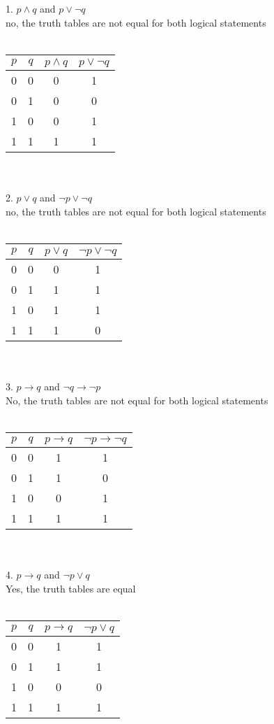 \documentclass[11pt]{article}
\begin{document}
1. $p \land q$ and $p \lor \neg q $ \\
no, the truth tables are not equal for both logical statements \\\\
\begin{tabular}{|c|c|c|c|}
\hline
$p$ & $q$ & $p \land q$ & $p \lor  \lnot q$ \\
\hline
0 & 0 & 0 & 1 \\
0 & 1 & 0 & 0 \\
1 & 0 & 0 & 1 \\
1 & 1 & 1 & 1 \\
\hline
\end{tabular} \\\\
2. $ p \lor q $ and $ \neg p \lor \neg q $ \\
no, the truth tables are not equal for both logical statements\\\\
\begin{tabular}{|c|c|c|c|}
\hline
$p$ & $q$ & $p \lor q$ & $ \lnot p \lor  \lnot q$ \\
\hline
0 & 0 & 0 & 1 \\
0 & 1 & 1 & 1 \\
1 & 0 & 1 & 1 \\
1 & 1 & 1 & 0 \\
\hline
\end{tabular} \\\\
3. $p \rightarrow q $ and $ \neg q \rightarrow \neg p $\\
No, the truth tables are not equal for both logical statements \\\\
\begin{tabular}{|c|c|c|c|}
\hline
$p$ & $q$ & $p \to q$ & $ \lnot p \to  \lnot q$ \\
\hline
0 & 0 & 1 & 1 \\
0 & 1 & 1 & 0 \\
1 & 0 & 0 & 1 \\
1 & 1 & 1 & 1 \\
\hline
\end{tabular} \\\\
4. $p \rightarrow q$ and $ \neg p \lor q $\\
Yes, the truth tables are equal \\\\
\begin{tabular}{|c|c|c|c|}
\hline
$p$ & $q$ & $p \to q$ & $ \lnot p \lor q$ \\
\hline
0 & 0 & 1 & 1 \\
0 & 1 & 1 & 1 \\
1 & 0 & 0 & 0 \\
1 & 1 & 1 & 1 \\
\hline
\end{tabular}\\\\
\end{document}
